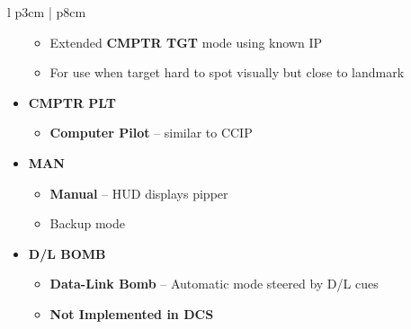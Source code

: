 \documentclass[8pt,usenames,dvipsnames,twoside]{article}
\begin{document}
\begin{center}
\begin{longtable}{l p{3cm} | p{8cm}}
\begin{minipage}[t]{\linewidth}
\begin{itemize}
\begin{itemize}
						\item Extended \textbf{CMPTR TGT} mode using known IP
						\item For use when target hard to spot visually but close to landmark
					\end{itemize}
					\item \textbf{CMPTR PLT}
					\begin{itemize}
						\item \textbf{Computer Pilot} -- similar to CCIP
					\end{itemize}
					\item \textbf{MAN}
					\begin{itemize}
						\item \textbf{Manual} -- HUD displays pipper
						\item Backup mode
					\end{itemize}
					\item \textbf{D/L BOMB}
					\begin{itemize}
						\item \textbf{Data-Link Bomb} -- Automatic mode steered by D/L cues
						\item \textbf{Not Implemented in DCS}
					\end{itemize}
				\end{itemize}
			\end{minipage} \\
			\bottomrule
		\end{longtable}
	\end{center}
\end{document}
